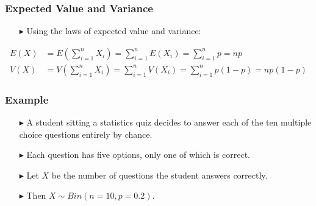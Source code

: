 \documentclass[12pt]{beamer}
\begin{document}
\begin{frame}
	\frametitle{Expected Value and Variance}
	
	\begin{itemize}
		\item[\color{blue}$\blacktriangleright$]Using the laws of expected value and variance:
	\end{itemize}
	
	\vspace{0.5cm}
	
	\begin{align*}
		E(X) &= E\left(\sum_{i=1}^n X_i\right) = \sum_{i=1}^n E(X_i) = \sum_{i=1}^n p = np \\[1em]
		V(X) &= V\left(\sum_{i=1}^n X_i\right) = \sum_{i=1}^n V(X_i) = \sum_{i=1}^n p(1-p) = np(1-p)
	\end{align*}
	
\end{frame}
\begin{frame}
	\frametitle{Example}
	
	\begin{itemize}
		\item[\color{blue}$\blacktriangleright$] A student sitting a statistics quiz decides to answer each of the ten multiple choice questions entirely by chance.
		
		\item[\color{blue}$\blacktriangleright$]Each question has five options, only one of which is correct.
		
		\item[\color{blue}$\blacktriangleright$]Let $X$ be the number of questions the student answers correctly.
		
		\item[\color{blue}$\blacktriangleright$]Then $X \sim Bin(n = 10, p = 0.2)$.
	\end{itemize}
	
\end{frame}
\end{document}
